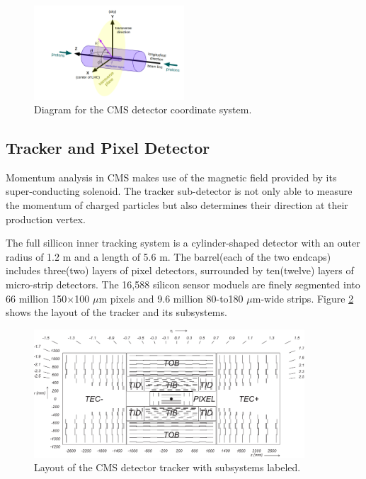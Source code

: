   \begin{figure}[H]
 	\centering
 	\includegraphics[width=0.5\textwidth]{figures/corsyslhc.png}
 	\singlespace
 	\caption{Diagram for the CMS detector coordinate system.}
 	\label{fig:cmscor}
 \end{figure}

 \subsection{Tracker and Pixel Detector}
 Momentum analysis in CMS makes use of the magnetic field provided by its super-conducting solenoid. The tracker sub-detector is not only able to measure the momentum of charged particles but also determines their direction at their production vertex.

 The full sillicon inner tracking system\cite{trackeradd} is a cylinder-shaped detector with an outer radius of 1.2 m and a length of 5.6 m. The barrel(each of the two endcaps) includes three(two) layers of pixel detectors, surrounded by ten(twelve) layers of micro-strip detectors. The 16,588 silicon sensor moduels are finely segmented into 66 million 150$\times$100 $\mu$m pixels and 9.6 million 80-to180 $\mu$m-wide strips. Figure \ref{fig:cmstracker} shows the layout of the tracker and its subsystems.

   \begin{figure}[H]
 	\centering
 	\includegraphics[width=0.9\textwidth]{figures/CMS_tracker.pdf}
 	\singlespace
 	\caption{Layout of the CMS detector tracker with subsystems labeled.}
 	\label{fig:cmstracker}
 \end{figure}

